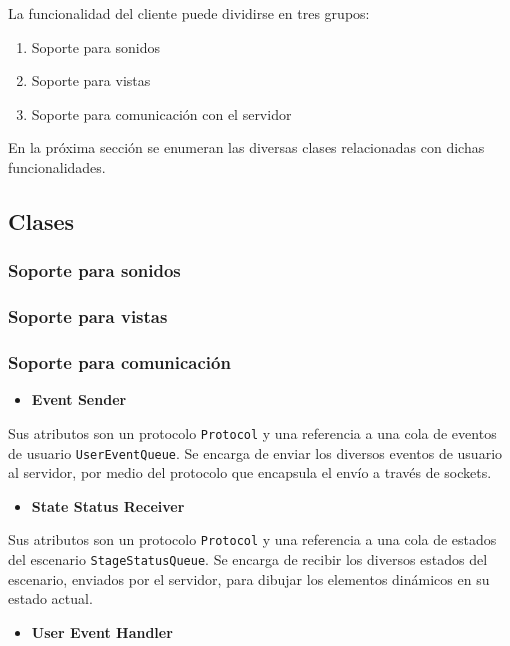 \documentclass[a4paper]{article}
\begin{document}
La funcionalidad del cliente puede dividirse en tres grupos:
\begin{enumerate}
	\item Soporte para sonidos
	\item Soporte para vistas
	\item Soporte para comunicación con el servidor
\end{enumerate}

En la próxima sección se enumeran las diversas clases relacionadas con dichas funcionalidades.

\subsection{Clases}

\subsubsection{Soporte para sonidos}

\subsubsection{Soporte para vistas}

\subsubsection{Soporte para comunicación}

\begin{itemize}
	\item \textbf{Event Sender}
\end{itemize}

Sus atributos son un protocolo \texttt{Protocol} y una referencia a una cola de eventos de usuario \texttt{UserEventQueue}. Se encarga de enviar los diversos eventos de usuario al servidor, por medio del protocolo que encapsula el envío a través de sockets.

\begin{itemize}
	\item \textbf{State Status Receiver}
\end{itemize}

Sus atributos son un protocolo \texttt{Protocol} y una referencia a una cola de estados del escenario \texttt{StageStatusQueue}. Se encarga de recibir los diversos estados del escenario, enviados por el servidor, para dibujar los elementos dinámicos en su estado actual.

\begin{itemize}
	\item \textbf{User Event Handler}
\end{itemize}
\end{document}
